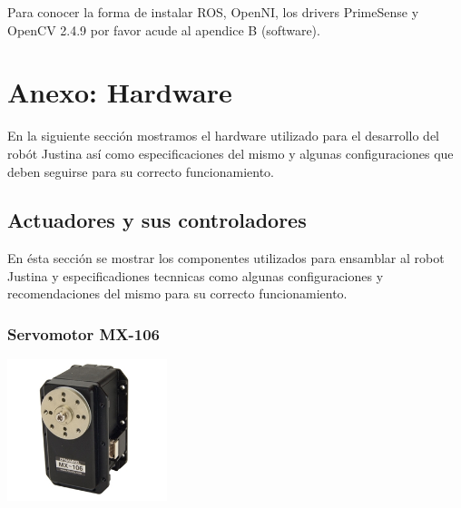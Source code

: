 \documentclass[a4paper]{book}
\begin{document}
Para conocer la forma de instalar ROS, OpenNI, los drivers PrimeSense y OpenCV 2.4.9 por favor acude al apendice B (software).



\appendix

\chapter{Anexo: Hardware} \label{aped.A}
En la siguiente sección mostramos el hardware utilizado para el desarrollo del robót Justina así como especificaciones
del mismo y algunas configuraciones que deben seguirse para su correcto funcionamiento.


\section{Actuadores y sus controladores}
En ésta sección se mostrar los componentes utilizados para ensamblar al robot Justina y especificadiones tecnnicas como
algunas configuraciones y recomendaciones del mismo para su correcto funcionamiento.


\subsection{Servomotor MX-106}

\begin{center}
\includegraphics[width=0.35\textwidth]{Figures/Hardware/Partes/MX-106.png}
\label{fig:Hardware:Partes:MX-106}
\end{center}
\end{document}
